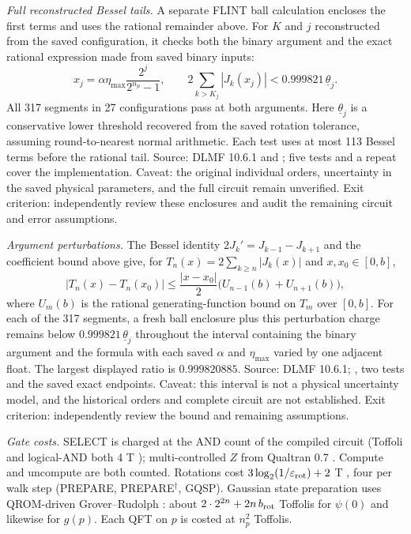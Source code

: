 \documentclass[11pt,a4paper]{article}
\begin{document}
\emph{Full reconstructed Bessel tails.} A separate FLINT ball calculation
encloses the first terms and uses the rational remainder above. For $K$ and
$j$ reconstructed from the saved configuration, it checks both the binary
argument and the exact rational expression made from saved binary inputs:
\[
 x_j=\alpha\eta_{\max}\frac{2^j}{2^{n_p}-1},\qquad
 2\sum_{k>K_j}|J_k(x_j)|<0.999821\,\underline\theta_j.
\]
All 317 segments in 27 configurations pass at both arguments. Here
$\underline\theta_j$ is a conservative lower threshold recovered from the
saved rotation tolerance, assuming round-to-nearest normal arithmetic. Each
test uses at most 113 Bessel terms before the rational tail. Source: DLMF
10.6.1 and ; five tests and a
repeat cover the implementation. Caveat: the original individual orders,
uncertainty in the saved physical parameters, and the full circuit remain
unverified. Exit criterion: independently review these enclosures and audit
the remaining circuit and error assumptions.

\emph{Argument perturbations.} The Bessel identity $2J_k'=J_{k-1}-J_{k+1}$
and the coefficient bound above give, for $T_n(x)=2\sum_{k\ge n}|J_k(x)|$
and $x,x_0\in[0,b]$,
\[
 |T_n(x)-T_n(x_0)|\le\frac{|x-x_0|}{2}\bigl(U_{n-1}(b)+U_{n+1}(b)\bigr),
\]
where $U_m(b)$ is the rational generating-function bound on $T_m$ over
$[0,b]$. For each of the 317 segments, a fresh ball enclosure plus this
perturbation charge remains below $0.999821\,\underline\theta_j$ throughout
the interval containing the binary argument and the formula with each saved
$\alpha$ and $\eta_{\max}$ varied by one adjacent float. The largest displayed
ratio is $0.999820885$. Source: DLMF 10.6.1;
, two tests and the saved
exact endpoints. Caveat: this interval is not a physical uncertainty model,
and the historical orders and complete circuit are not established. Exit
criterion: independently review the bound and remaining assumptions.

\emph{Gate costs.} SELECT is charged at the AND count of the compiled circuit
(Toffoli and logical-AND both 4 T \cite{gidney2018}); multi-controlled $Z$ from Qualtran 0.7 \cite{qualtran}.
Compute and uncompute are both counted. Rotations cost
$3\log_2(1/\varepsilon_{\rm rot})+2$ T \cite{rossselinger2016}, four per
walk step (PREPARE, PREPARE$^\dagger$, GQSP). Gaussian state preparation
uses QROM-driven Grover--Rudolph \cite{groverrudolph2002,babbush2018}:
about $2\cdot2^{2n}+2n\,b_{\rm rot}$ Toffolis for $\psi(0)$ and likewise
for $g(p)$. Each QFT on $p$ is costed at $n_p^2$ Toffolis.
\end{document}
